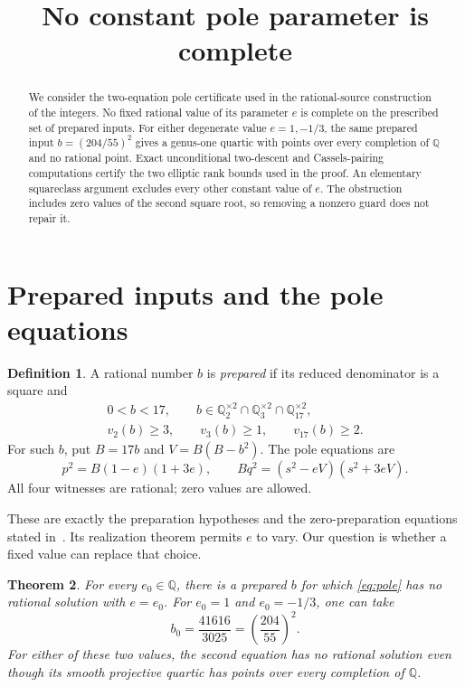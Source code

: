 \documentclass[11pt,a4paper]{article}
\title{No constant pole parameter is complete}
\author{}\date{}
\newtheorem{theorem}{Theorem}[section]
\theoremstyle{definition}\newtheorem{definition}[theorem]{Definition}
\newcommand{\Q}{\mathbb Q}\newcommand{\Z}{\mathbb Z}
\begin{document}
\maketitle
\begin{abstract}
We consider the two-equation pole certificate used in the rational-source
construction of the integers.  No fixed rational value of its parameter
$e$ is complete on the prescribed set of prepared inputs.  For either
degenerate value $e=1,-1/3$, the same prepared input
$b=(204/55)^2$ gives a genus-one quartic with points over every completion
of $\Q$ and no rational point.  Exact unconditional two-descent and
Cassels-pairing computations certify the two elliptic rank bounds used
in the proof.  An elementary squareclass argument excludes every other
constant value of $e$.  The obstruction includes zero values of the
second square root, so removing a nonzero guard does not repair it.
\end{abstract}

\section{Prepared inputs and the pole equations}

\begin{definition}
A rational number $b$ is \emph{prepared} if its reduced denominator is
a square and
\[
 \begin{gathered}
 0<b<17,\qquad b\in\Q_2^{\times2}\cap\Q_3^{\times2}
                      \cap\Q_{17}^{\times2},\\
 v_2(b)\ge3,\qquad v_3(b)\ge1,\qquad v_{17}(b)\ge2.
 \end{gathered}
\]
For such $b$, put $B=17b$ and $V=B(B-b^2)$.  The pole equations are
\begin{equation}\label{eq:pole}
 p^2=B(1-e)(1+3e),\qquad
 Bq^2=(s^2-eV)(s^2+3eV).
\end{equation}
All four witnesses are rational; zero values are allowed.
\end{definition}

These are exactly the preparation hypotheses and the zero-preparation
equations stated in~\cite[Section~3]{Dependencies}.  Its realization
theorem permits $e$ to vary.  Our question is whether a fixed value
can replace that choice.

\begin{theorem}\label{thm:fixed-e}
For every $e_0\in\Q$, there is a prepared $b$ for which
\eqref{eq:pole} has no rational solution with $e=e_0$.
For $e_0=1$ and $e_0=-1/3$, one can take
\[
                          b_0=\frac{41616}{3025}=\left(\frac{204}{55}\right)^2.
\]
For either of these two values, the second equation has no rational
solution even though its smooth projective quartic has points over
every completion of $\Q$.
\end{theorem}
\end{document}
